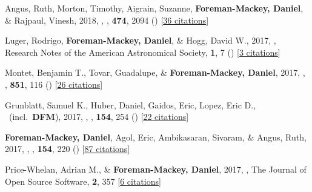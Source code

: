 \item[{\color{numcolor}\scriptsize32}] Angus, Ruth, Morton, Timothy, Aigrain, Suzanne, \textbf{Foreman-Mackey, Daniel}, \& Rajpaul, Vinesh, 2018, , \mnras, \textbf{474}, 2094 () [\href{http://adsabs.harvard.edu/abs/2018MNRAS.474.2094A}{36 citations}]

\item[{\color{numcolor}\scriptsize31}] Luger, Rodrigo, \textbf{Foreman-Mackey, Daniel}, \& Hogg, David W., 2017, , Research Notes of the American Astronomical Society, \textbf{1}, 7 () [\href{http://adsabs.harvard.edu/abs/2017RNAAS...1a...7L}{3 citations}]

\item[{\color{numcolor}\scriptsize30}] Montet, Benjamin T., Tovar, Guadalupe, \& \textbf{Foreman-Mackey, Daniel}, 2017, , \apj, \textbf{851}, 116 () [\href{http://adsabs.harvard.edu/abs/2017ApJ...851..116M}{26 citations}]

\item[{\color{numcolor}\scriptsize29}] Grunblatt, Samuel K., Huber, Daniel, Gaidos, Eric, Lopez, Eric D., \etal\ (incl.\ \textbf{DFM}), 2017, , \aj, \textbf{154}, 254 () [\href{http://adsabs.harvard.edu/abs/2017AJ....154..254G}{22 citations}]

\item[{\color{numcolor}\scriptsize28}] \textbf{Foreman-Mackey, Daniel}, Agol, Eric, Ambikasaran, Sivaram, \& Angus, Ruth, 2017, , \aj, \textbf{154}, 220 () [\href{http://adsabs.harvard.edu/abs/2017AJ....154..220F}{87 citations}]

\item[{\color{numcolor}\scriptsize27}] Price-Whelan, Adrian M., \& \textbf{Foreman-Mackey, Daniel}, 2017, , The Journal of Open Source Software, \textbf{2}, 357 [\href{http://adsabs.harvard.edu/abs/2017JOSS....2..357P}{6 citations}]

